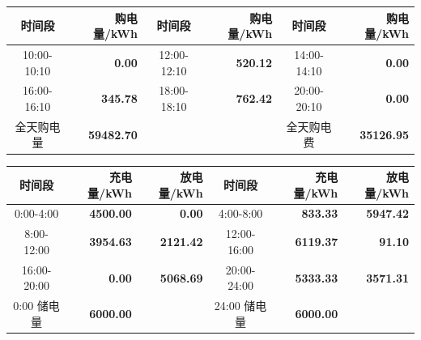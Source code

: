 {\setlength{\tabcolsep}{2pt}
\begin{center}
\begin{tabular}{|c|r|c|r|c|r|}
\hline
时间段 & 购电量/kWh & 时间段 & 购电量/kWh & 时间段 & 购电量/kWh \\
\hline
10:00-10:10 & \textbf{0.00} & 12:00-12:10 & \textbf{520.12} & 14:00-14:10 & \textbf{0.00} \\
\hline
16:00-16:10 & \textbf{345.78} & 18:00-18:10 & \textbf{762.42} & 20:00-20:10 & \textbf{0.00} \\
\hline
全天购电量 & \textbf{59482.70} & & & 全天购电费 & \textbf{35126.95} \\
\hline
\end{tabular}
\par{}

\vspace{0.15\baselineskip}
\begin{tabular}{|c|r|r|c|r|r|}
\hline
时间段 & 充电量/kWh & 放电量/kWh & 时间段 & 充电量/kWh & 放电量/kWh \\
\hline
0:00-4:00 & \textbf{4500.00} & \textbf{0.00} & 4:00-8:00 & \textbf{833.33} & \textbf{5947.42} \\
\hline
8:00-12:00 & \textbf{3954.63} & \textbf{2121.42} & 12:00-16:00 & \textbf{6119.37} & \textbf{91.10} \\
\hline
16:00-20:00 & \textbf{0.00} & \textbf{5068.69} & 20:00-24:00 & \textbf{5333.33} & \textbf{3571.31} \\
\hline
0:00 储电量 & \textbf{6000.00} & & 24:00 储电量 & \textbf{6000.00} & \\
\hline
\end{tabular}
\par{}

\end{center}
}
